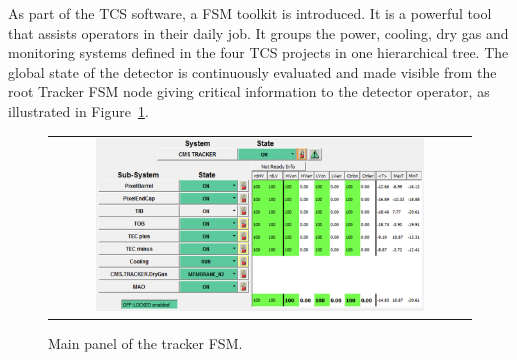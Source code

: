 As part of the \ac{TCS} software, a \ac{FSM} toolkit is introduced. It is a powerful tool that assists operators in their daily job. It groups the power, cooling, dry gas and monitoring systems defined in the four \ac{TCS} projects in one hierarchical tree. The global state of the detector is continuously evaluated and made visible from the root Tracker FSM node giving critical information to the detector operator, as illustrated in Figure~\ref{fig:DCS}.

\begin{figure}[tbh!]
 \begin{center}
 \begin{tabular}{c}
 \includegraphics[width=0.8\textwidth]{figures/Part2/Operation/TrackerDCS}
 \end{tabular}
 \caption{Main panel of the tracker \ac{FSM}.}
 \label{fig:DCS}
 \end{center}
\end{figure}